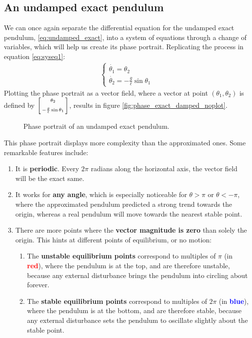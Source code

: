 \documentclass[12pt, a4paper, titlepage]{article}
\theoremstyle{definition}
\numberwithin{equation}{section}
\theoremstyle{definition}
\theoremstyle{definition}
\begin{document}
\subsection{An undamped exact pendulum}
We can once again separate the differential equation for the undamped exact pendulum, \eqref{eq:undamped_exact}, into a system of equations through a change of variables, which will help us create its phase portrait. Replicating the process in equation \eqref{eq:syseq1}:
\begin{align}
\begin{cases}
\dot{\theta_1}=\theta_2\\
\dot{\theta_2}=-\frac{g}{\ell}\sin\theta_1
\end{cases}
\end{align}
Plotting the phase portrait  as a vector field, where a vector at point $(\theta_1, \theta_2)$ is defined by $\begin{bsmallmatrix}\theta_2\\[6pt]-\frac{g}{\ell}\sin\theta_1\end{bsmallmatrix}$, results in figure \ref{fig:phase_exact_damped_noplot}.
\begin{figure}[H]
    \centering
    
    \caption{Phase portrait of an undamped exact pendulum.}
    \label{fig:phase_exact_simple_noplot}
\end{figure}
This phase portrait displays more complexity than the approximated ones. Some remarkable features include:
\begin{enumerate}
\item It is \textbf{periodic}. Every $2\pi$ radians along the horizontal axis, the vector field will be the exact same.
\item It works for \textbf{any angle}, which is especially noticeable for $\theta>\pi$ or $\theta<-\pi$, where the approximated pendulum predicted a strong trend towards the origin, whereas a real pendulum will move towards the nearest stable point.
\item There are more points where the \textbf{vector magnitude is zero} than solely the origin. This hints at different points of equilibrium, or no motion:
\begin{enumerate}
\item The \textbf{unstable equilibrium points} correspond to multiples of $\pi$ (in \textcolor{red}{\textbf{red}}), where the pendulum is at the top, and are therefore unstable, because any external disturbance brings the pendulum into circling about forever.
\item The \textbf{stable equilibrium points} correspond to multiples of $2\pi$ (in \textcolor{blue}{\textbf{blue}}), where the pendulum is at the bottom, and are therefore stable, because any external disturbance sets the pendulum to oscillate slightly about the stable point.
\end{enumerate}
\end{enumerate}
\end{document}
